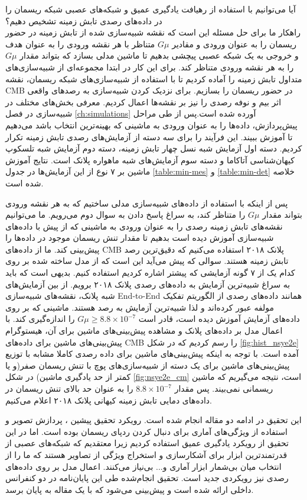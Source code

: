 آیا می‌توانیم با استفاده از رهیافت یادگیری عمیق و شبکه‌های عصبی شبکه ریسمان را در داده‌های رصدی تابش زمینه تشخیص دهیم؟    \\
راهکار ما برای حل مسئله این است که نقشه شبیه‌سازی شده از تابش زمینه در حضور ریسمان را به عنوان ورودی و مقادیر  $G\mu$ متناظر با هر نقشه ورودی را به عنوان هدف و خروجی به یک شبکه عصبی پیچشی بدهیم تا ماشین مدلی بسازد که بتواند مقدار $G\mu$ را به هر نقشه ورودی متناظر کند. 
برای این کار در ابتدا مجموعه‌ای از شبیه‌سازی‌های متداول تابش زمینه را آماده کردیم تا با استفاده از شبیه‌سازی‌های شبکه ریسمان، نقشه‌ CMB در حضور ریسمان را بسازیم. برای نزدیک کردن شبیه‌سازی به رصدهای واقعی اثر بیم و نوفه رصدی را نیز بر نقشه‌ها اعمال کردیم. معرفی بخش‌های مختلف در شبیه‌سازی در فصل 
\ref{ch:simulations}
آورده شده است.پس از طی مراحل پیش‌پردازش، داده‌ها را به عنوان ورودی به ماشینی که بهینه‌ترین انتخاب باشد می‌دهیم تا آموزش ببیند. این فرآیند را برای سه دسته از آزمایش‌های رصدی تابش زمینه تکرار کردیم. دسته اول آزمایش شبه نسل چهار تابش زمینه، دسته دوم آزمایش شبه تلسکوپ کیهان‌شناسی آتاکاما و دسته سوم آزمایش‌های شبه ماهواره پلانک است. نتایج آموزش ماشین بر ۷ نوع از این آزمایش‌ها در جدول 
\ref{table:min-mes} 
و
\ref{table:min-det}
خلاصه شده است.
\par
پس از اینکه با استفاده از داده‌های شبیه‌سازی مدلی ساختیم که به هر نقشه ورودی بتواند مقدار $G\mu$ را متناظر کند، به سراغ پاسخ دادن به سوال دوم می‌رویم. ما می‌توانیم نقشه‌های تابش زمینه رصدی را به عنوان ورودی به ماشینی که از پیش با داده‌های شبیه‌سازی آموزش دیده است بدهیم تا مقدار تنش ریسمان موجود در داده‌ها را پیش‌بینی کند. ما از داده‌های CMB پلانک ۲۰۱۸ استفاده می‌کنیم که دقیق‌ترین رصد تابش زمینه هستند. سوالی که پیش می‌آید این است که از مدل  ساخته شده بر روی کدام یک از ۷ گونه آزمایشی که پیشتر اشاره کردیم استفاده کنیم. بدیهی است که باید به سراغ شبیه‌ترین آزمایش به داده‌های رصدی پلانک ۲۰۱۸ برویم. از بین آزمایش‌های شبه پلانک، نقشه‌های شبیه‌سازی End-to-End همانند داده‌های رصدی از الگوریتم تفکیک مولفه عبور کرده‌اند و لذا شبیه‌ترین آزمایش به رصد هستند. ماشینی که بر روی داده‌های آزمایش 
آموزش دیده است، قادر است 
$G\mu \geq 8.8 \times 10^{-7}$
را اندازه‌گیری کند. با اعمال مدل  بر داده‌های پلانک و مشاهده پیش‌بینی‌های ماشین برای آن، هیستوگرام پیش‌بینی‌های ماشین برای داده‌های CMB را رسم کردیم که در شکل
\ref{fig:hist_nsye2e}
آمده است. با توجه به اینکه پیش‌بینی‌های ماشین برای داده رصدی کاملا مشابه با توزیع پیش‌بینی‌های ماشین برای یک دسته از شبیه‌سازی‌های پوچ با تنش ریسمان صفر(و یا کمتر از حد یادگیری ماشین) در شکل
\ref{fig:nsye2e_cm}
است، نتیجه می‌گیریم که ماشین ریسمانی نمی‌بیند. پس مقدار  
$8.8 \times 10^{-7}$
را به عنوان حد بالای تنش ریسمان در داده‌های دمایی تابش زمینه کیهانی پلانک ۲۰۱۸ اعلام می‌کنیم.
\par
این تحقیق در ادامه دو مقاله
\cite{vafaei2017multiscale , vafaei2018cosmic}
انجام شده است. رویکرد تحقیق پیشین ، پردازش تصویر و استفاده از ویژگی‌های آماری برای دنبال کردن ردپای ریسمان بوده است. اما در این تحقیق از رویکرد یادگیری عمیق استفاده کردیم زیرا معتقدیم که شبکه‌های عصبی از قدرتمندترین ابزار برای آشکارسازی و استخراج ویژگی از تصاویر هستند که ما را از انتخاب میان بی‌شمار ابزار آماری و... بی‌نیاز می‌کنند. اعمال مدل بر روی داده‌های رصدی نیز رویکردی جدید است. تحقیق انجام‌شده طی این پایان‌نامه در دو کنفرانس داخلی ارائه شده است و پیش‌بینی می‌شود که با یک مقاله به پایان برسد.     

